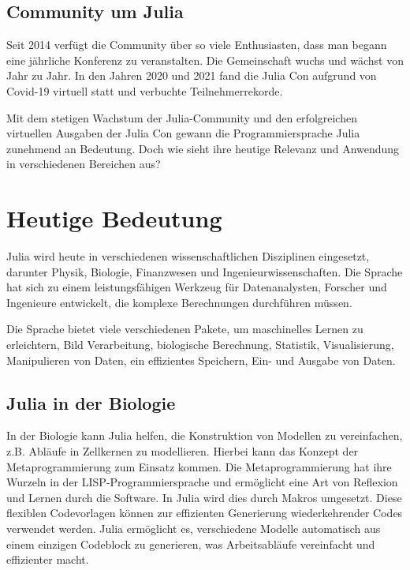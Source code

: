 \subsection{Community um Julia}
Seit 2014 verfügt die Community  über so viele Enthusiasten, dass man begann eine jährliche Konferenz zu veranstalten. \cite{juliacon2014}
Die Gemeinschaft wuchs und wächst von Jahr zu Jahr. In den Jahren 2020 und 2021 fand die Julia Con aufgrund von Covid-19 virtuell statt \cite{juliacon2020} und verbuchte Teilnehmerrekorde.

Mit dem stetigen Wachstum der Julia-Community und den erfolgreichen virtuellen Ausgaben der Julia Con gewann die Programmiersprache Julia zunehmend an Bedeutung. Doch wie sieht ihre heutige Relevanz und Anwendung in verschiedenen Bereichen aus?

\section{Heutige Bedeutung}
Julia wird heute in verschiedenen wissenschaftlichen Disziplinen eingesetzt,
darunter Physik, Biologie, Finanzwesen und Ingenieurwissenschaften. Die Sprache hat sich zu einem leistungsfähigen Werkzeug für Datenanalysten, Forscher und Ingenieure entwickelt, die komplexe Berechnungen durchführen müssen. \newline

Die Sprache bietet viele verschiedenen Pakete, um maschinelles Lernen zu erleichtern, Bild Verarbeitung, biologische Berechnung, Statistik, Visualisierung, Manipulieren von Daten, ein effizientes Speichern, Ein- und Ausgabe von Daten. 
\cite{roesch2023julia}


\subsection{Julia in der Biologie}
In der Biologie kann Julia helfen, die Konstruktion von Modellen zu vereinfachen, z.B. Abläufe in Zellkernen zu modellieren.
Hierbei kann das Konzept der Metaprogrammierung zum Einsatz kommen.  
Die Metaprogrammierung hat ihre Wurzeln in der LISP-Programmiersprache und ermöglicht eine Art von Reflexion und Lernen durch die Software. In Julia wird dies durch Makros umgesetzt. Diese flexiblen Codevorlagen können zur effizienten Generierung wiederkehrender Codes verwendet werden.
Julia ermöglicht es, verschiedene Modelle automatisch aus einem einzigen Codeblock zu generieren, was Arbeitsabläufe vereinfacht und effizienter macht. \cite{roesch2023julia}

